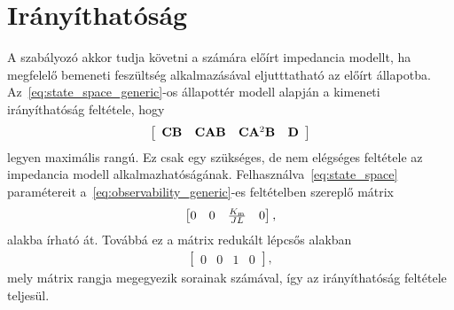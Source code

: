 \chapter{Irányíthatóság}\label{chap:controllability}
A szabályozó akkor tudja követni a számára előírt impedancia modellt, 
ha megfelelő bemeneti feszültség alkalmazásával eljutttatható az előírt állapotba. 
Az~\eqref{eq:state_space_generic}-os állapottér modell alapján a kimeneti irányíthatóság feltétele, hogy
\begin{align}\label{eq:observability_generic}
    \left[\begin{array}{c|c|c|c}
        \mathbf{CB} & \mathbf{CAB} & \mathbf{C} \mathbf{A}^2 \mathbf{B} & \mathbf{D}
    \end{array}\right]
\end{align}
legyen maximális rangú. Ez csak egy szükséges, de nem elégséges feltétele az impedancia modell alkalmazhatóságának.
Felhasználva~\eqref{eq:state_space} paramétereit a~\eqref{eq:observability_generic}-es feltételben szereplő mátrix
\begin{align}
    \begin{bmatrix}
        0 & 0 & \frac{K_{\mathrm{m}}}{JL} & 0
    \end{bmatrix},
\end{align}
alakba írható át. Továbbá ez a mátrix redukált lépcsős alakban
\begin{align}
    \begin{bmatrix}
        0 & 0 & 1 & 0
    \end{bmatrix},
\end{align}
mely mátrix rangja megegyezik sorainak számával, így az irányíthatóság feltétele teljesül.